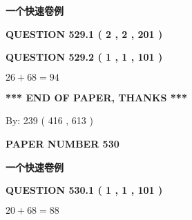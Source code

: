 \documentclass{ctexart}
\begin{document}
   
   
   
   
   
 \vspace{0.2in}
{\LARGE {\textbf{ 一个快速卷例}}}
   
   
  
\vspace{0.2in}
  
{\textbf{\Large{QUESTION
529.1 
 ( 2 , 2 , 201 )
}}}
  
  
  
\vspace{0.2in}
  
{\textbf{\Large{QUESTION
529.2 
 ( 1 , 1 , 101 )
}}}
  
  
 
 

$ %
26 +  %
68=   %
94$
 
 
   
   
 \vspace{0.2in}
 
   
   
   
   
\vspace{1.0in} 
{\textbf{\large{ *** END OF PAPER, THANKS *** }}} 
   
   
\hspace{1.0in} By: 
 239 ( 416 ,  613 )
   
   
   
   
\newpage 
\setcounter{page}{ 
   530001 } 
   
   
   
   
 {\textbf{ \Large{ PAPER NUMBER  530  }}}
   
   
\vspace{0.2in}
   
   
   
   
   
   
 \vspace{0.2in}
{\LARGE {\textbf{ 一个快速卷例}}}
   
   
  
\vspace{0.2in}
  
{\textbf{\Large{QUESTION
530.1 
 ( 1 , 1 , 101 )
}}}
  
  
 
 

$ %
20 +  %
68=   %
88$
 
\end{document}
